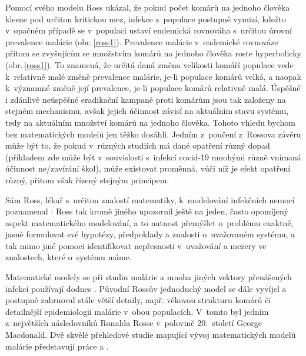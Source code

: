 Pomocí svého modelu \cite{Smith_etal2012} Ross ukázal, že pokud počet komárů na jednoho člověka klesne pod určitou kritickou mez, infekce z~populace postupně vymizí, kdežto v~opačném případě se v~populaci ustaví endemická rovnováha s~určitou úrovní prevalence malárie (obr.\,\ref{ross1}). Prevalence malárie v~endemické rovnováze přitom se zvyšujícím se množstvím komárů na jednoho člověka roste hyperbolicky (obr.\,\ref{ross1}). To znamená, že určitá daná změna velikosti komáří populace vede k~relativně malé změně prevalence malárie, je-li populace komárů velká, a naopak k~významné změně její prevalence, je-li populace komárů relativně malá. Úspěšné i zdánlivě neúspěšné eradikační kampaně proti komárům jsou tak založeny na stejném mechanismu, avšak jejich účinnost závisí na aktuálním stavu systému, tedy na aktuálním množství komárů na jednoho člověka. Tohoto vhledu bychom bez matematických modelů jen těžko dosáhli. Jedním z~poučení z~Rossova závěru může být to, že pokud v~různých studiích má dané opatření různý dopad (příkladem zde může být v~souvislosti s~infekcí covid-19 mnohými různě vnímaná účinnost ne/zavírání škol), může existovat proměnná, vůči níž je efekt opatření různý, přitom však řízený stejným principem. 

Sám Ross, lékař s~určitou znalostí matematiky, k~modelování infekčních nemocí poznamenal \cite{Bacaer2011}:  Ross tak kromě jiného upozornil ještě na jeden, často opomíjený aspekt matematického modelování, a to nutnost přemýšlet o~problému exaktně, jasně formulovat své hypotézy, předpoklady a znalosti o~uvažovaném systému, a tak mimo jiné pomoci identifikovat nepřesnosti v~uvažování a mezery ve znalostech, které o~systému máme.     

Matematické modely se při studiu malárie a mnoha jiných vektory přenášených infekcí používají dodnes \cite{Gratz1999,Reiner_etal2012}. Původní Rossův jednoduchý model se dále vyvíjel a postupně zahrnoval stále větší detaily, např. věkovou strukturu komárů či detailnější epidemiologii malárie v~obou populacích. V~tomto byl jedním z~největších následovníků Ronalda Rosse v~polovině 20.\ století George Macdonald. Dvě skvělé přehledové studie mapující vývoj matematických modelů malárie představují práce \cite{Smith_etal2012} a \cite{Smith_etal2018}.

